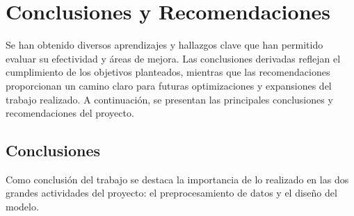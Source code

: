 \chapter{Conclusiones y Recomendaciones}

Se han obtenido diversos aprendizajes y hallazgos clave que han permitido evaluar su efectividad y áreas de mejora. Las conclusiones derivadas reflejan el cumplimiento de los objetivos planteados, mientras que las recomendaciones proporcionan un camino claro para futuras optimizaciones y expansiones del trabajo realizado. A continuación, se presentan las principales conclusiones y recomendaciones del proyecto.

\section{Conclusiones}
    Como conclusión del trabajo se destaca la importancia de lo realizado en las dos grandes actividades del proyecto: el preprocesamiento de datos y el diseño del modelo.  
    
